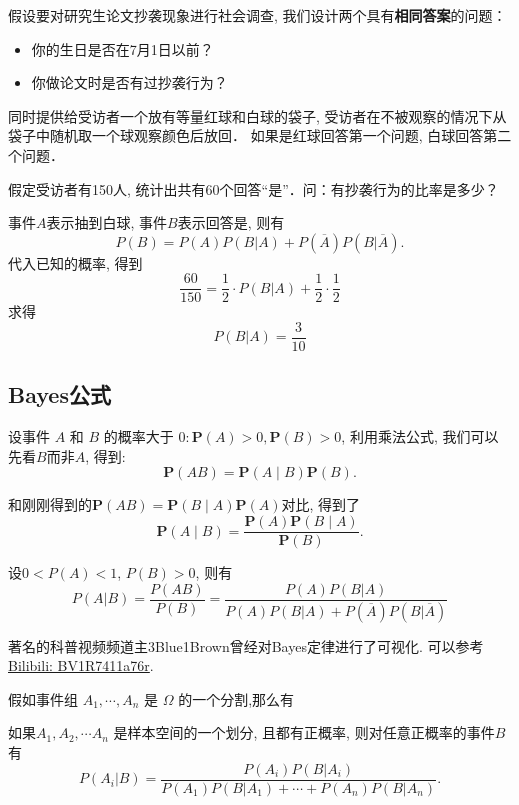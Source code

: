 \begin{example}
    假设要对研究生论文抄袭现象进行社会调查, 我们设计两个具有\textbf{相同答案}的问题：
    \begin{itemize}
        \item 你的生日是否在7月1日以前？
        \item 你做论文时是否有过抄袭行为？
    \end{itemize}
    同时提供给受访者一个放有等量红球和白球的袋子, 
    受访者在不被观察的情况下从袋子中随机取一个球观察颜色后放回．
    如果是红球回答第一个问题, 白球回答第二个问题．

    假定受访者有150人, 统计出共有60个回答“是”．问：有抄袭行为的比率是多少？
\end{example}

\begin{solution}
    事件$A$表示抽到白球, 事件$B$表示回答是, 则有
    $$P(B)=P(A)P(B|A)+P(\overline{A})P(B|\overline{A}).$$
    代入已知的概率, 得到
    $$\frac{60}{150}=\frac12\cdot P(B|A)+\frac12\cdot\frac12 $$
    求得
    $$P(B|A)=\frac{3}{10}$$
\end{solution}

\subsection{Bayes公式}
设事件 $A$ 和 $B$ 的概率大于 $0: \mathbf{P}(A)>0, \mathbf{P}(B)>0$, 利用乘法公式, 我们可以先看$B$而非$A$, 得到: 
$$\mathbf{P}(A B)=\mathbf{P}(A \mid B) \mathbf{P}(B).$$

和刚刚得到的$\mathbf{P}(A B)=\mathbf{P}(B \mid A) \mathbf{P}(A)$对比, 得到了$$\mathbf{P}(A \mid B)=\frac{\mathbf{P}(A) \mathbf{P}(B \mid A)}{\mathbf{P}(B)}.$$

\begin{theorem}[Bayes定理]
    设$0<P(A)<1$, $P(B)>0$, 则有
    $$P(A|B)=\frac{P(AB)}{P(B)}
        =\frac{P(A)P(B|A)}{P(A)P(B|A)+P(\overline{A})P(B|\overline{A})}$$
\end{theorem}

\begin{webaside}
    著名的科普视频频道主3Blue1Brown曾经对Bayes定律进行了可视化. 可以参考\href{https://www.bilibili.com/video/BV1R7411a76r}{Bilibili: BV1R7411a76r}.
\end{webaside}
假如事件组 $A_1, \cdots, A_n$ 是 $\Omega$ 的一个分割,那么有

\begin{corollary}
    如果$A_1, A_2, \cdots A_n$ 是样本空间的一个划分, 且都有正概率, 则对任意正概率的事件$B$有
    \[
        P(A_i|B)=\frac{P(A_i)P(B|A_i)}{P(A_1)P(B|A_1)+\cdots+P(A_n)P(B|A_n)}.%
    \]
\end{corollary}

